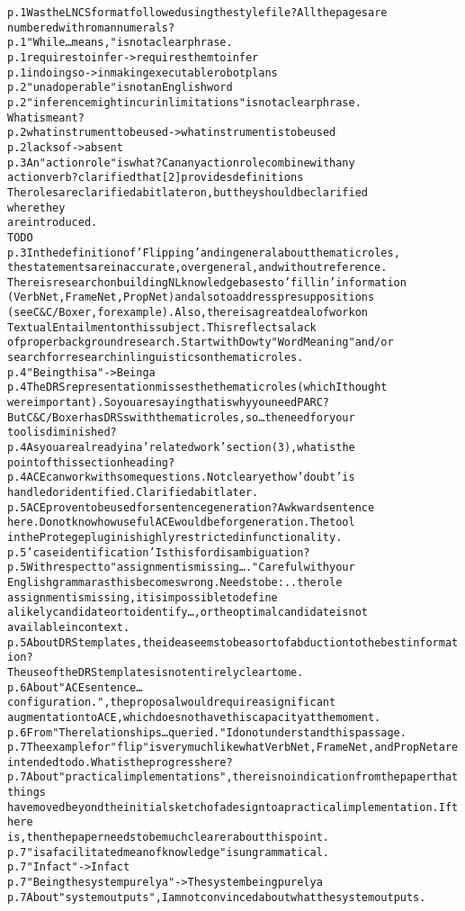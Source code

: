 \documentclass[oribibl]{llncs}
\newcommand{\comment}[1]{{\color{red} #1}}
\newcommand{\tick}{{\color{red}\ding{52}}}
\begin{document}
\begin{alltt}
p. 1 Was the LNCS format followed using the style file?  All the pages are 
numbered with roman numerals? \tick
p. 1 "While…means," is not a clear phrase.
p. 1 requires to infer -> requires them to infer \tick
p. 1 in doing so -> in making executable robot plans
p. 2 "unadoperable" is not an English word \tick
p. 2  "inference might incur in limitations" is not a clear phrase. 
 What is meant?
p. 2  what instrument to be used -> what instrument is to be used \tick
p. 2 lacks of -> absent \tick
p. 3 An "action role" is what?  Can any action role combine with any 
action verb? \tick \comment{clarified that [2] provides definitions} 
The roles are clarified a bit later on, but they should be clarified 
where they 
are introduced.
\comment{TODO}
p. 3 In the definition of 'Flipping' and in general about thematic roles,
 the statements are inaccurate, overgeneral, and without reference.  
 There is research on building NL knowledge bases to 'fill in' information
  (VerbNet, FrameNet, PropNet) and also to address presuppositions 
  (see C&C/Boxer, for example).  Also, there is a great deal of work on 
  Textual Entailment on this subject.  This reflects a lack 
 of proper background research.  Start with Dowty "Word Meaning" and/or 
 search for research in linguistics on thematic roles.
p. 4 "Being this a" -> Being a \tick
p. 4 The DRS representation misses the thematic roles (which I thought 
were important). So you are saying that is why you need PARC?  
But C&C/Boxer has DRSs with thematic roles, so…the need for your 
tool is diminished?
p. 4 As you are already in a 'related work' section (3), what is the 
point of this section heading? \tick
p. 4 ACE can work with some questions.  Not clear yet how 'doubt' is
 handled or identified. Clarified a bit later. 
p. 5 ACE proven to be used for sentence generation?  Awkward sentence
 here.  Do not know how useful ACE would be for generation.  The tool 
 in the Protege plug in is highly restricted in functionality. \tick
p. 5 'case identification' Is this for disambiguation?
p. 5 With respect to "assignment is missing…."  Careful with your
 English grammar as this becomes wrong.  Needs to be: ..the role 
 assignment is missing, it is impossible to define 
a likely candidate or to identify…, or the optimal candidate is not
 available in context.
p. 5 About DRS templates, the idea seems to be a sort of abduction to the best information?
  The use of the DRS templates is not entirely clear to me.
p. 6 About "ACE sentence…configuration.", the proposal would require a significant 
augmentation to ACE, which does not have this capacity at the moment.
p. 6 From "The relationships…queried."  I do not understand this passage.
p. 7 The example for "flip" is very much like what VerbNet, FrameNet, and PropNet are 
intended to do.  What is the progress here?
p. 7 About "practical implementations", there is no indication from the paper that things 
have moved beyond the initial sketch of a design to a practical implementation.  If there 
is, then the paper needs to be much clearer about this point.
p. 7 "is a facilitated mean of knowledge" is ungrammatical. \tick
p. 7 "Infact" -> In fact \tick
p. 7 "Being the system purely a" -> The system being purely a \tick
p. 7 About "system outputs", I am not convinced about what the system outputs. \tick



\end{alltt}
\end{document}
